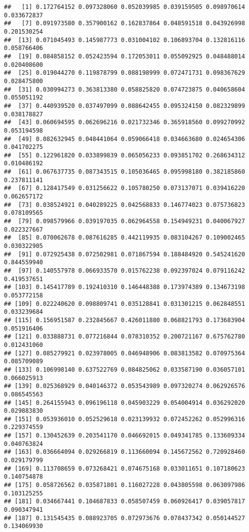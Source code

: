 \documentclass[
]{article}
\begin{document}
\begin{verbatim}
##   [1] 0.172764152 0.097328060 0.052039985 0.039159505 0.098970614 0.033672837
##   [7] 0.091973580 0.357900162 0.162837864 0.048591518 0.043926998 0.201530254
##  [13] 0.071045493 0.145987773 0.031004102 0.106893704 0.132816116 0.058766406
##  [19] 0.084858152 0.052423594 0.172053011 0.055092925 0.048488014 0.020408600
##  [25] 0.019044270 0.119878799 0.088198999 0.072471731 0.098367629 0.028475800
##  [31] 0.030994273 0.363813380 0.058825820 0.074723875 0.040658604 0.055051192
##  [37] 0.440939520 0.037497099 0.088642455 0.095324150 0.082329899 0.038178827
##  [43] 0.060694595 0.062696216 0.021732346 0.365918560 0.099270992 0.053194598
##  [49] 0.082632945 0.048441064 0.059066418 0.034663680 0.024654306 0.041702275
##  [55] 0.122961820 0.033899839 0.065056233 0.093851702 0.268634312 0.010486192
##  [61] 0.067637735 0.087343515 0.105036465 0.095998180 0.382185860 0.237811141
##  [67] 0.128417549 0.031256622 0.105780250 0.073137071 0.039416220 0.062657172
##  [73] 0.038524921 0.040289225 0.042568833 0.146774023 0.075736823 0.078109565
##  [79] 0.098579966 0.039197035 0.062964558 0.154949231 0.040067927 0.022327667
##  [85] 0.070062678 0.087616285 0.442119935 0.083104267 0.109002465 0.030322905
##  [91] 0.072925438 0.072502981 0.071867594 0.188484920 0.545241620 0.844559940
##  [97] 0.140557978 0.066933570 0.015762238 0.092397024 0.079116242 0.419537651
## [103] 0.145417789 0.192410310 0.146448388 0.173974389 0.134673198 0.053772158
## [109] 0.022240620 0.098809741 0.035128841 0.031301215 0.062848551 0.033239684
## [115] 0.156951587 0.232845667 0.426011880 0.068821793 0.173683904 0.051916406
## [121] 0.033888731 0.077216844 0.078310352 0.200721167 0.675762780 0.012431060
## [127] 0.085279921 0.023978005 0.046948906 0.083813582 0.070975364 0.085709089
## [133] 0.106998140 0.637522769 0.084825062 0.033587190 0.036057101 0.066025913
## [139] 0.025368929 0.040146372 0.053543989 0.097320274 0.062926576 0.086545563
## [145] 0.264155943 0.096196118 0.045903229 0.054004914 0.036292020 0.029883830
## [151] 0.053936010 0.052529618 0.023139932 0.072452262 0.052996316 0.229374559
## [157] 0.130452639 0.203541170 0.046692015 0.049341785 0.133609334 0.040763824
## [163] 0.036664094 0.029266819 0.113660094 0.145672562 0.720928460 0.029179799
## [169] 0.113708659 0.073268421 0.074675168 0.033011651 0.107180623 0.140754878
## [175] 0.058726562 0.035871801 0.116027228 0.043805598 0.063097986 0.103125255
## [181] 0.034667441 0.104687833 0.058507459 0.060926417 0.039057817 0.090347941
## [187] 0.131545435 0.088923705 0.072973676 0.078437342 0.050144527 0.134069930

\end{verbatim}
\end{document}

